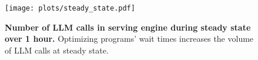 \begin{figure}[t]
\centering
\texttt{[image: plots/steady\_state.pdf]}

\vspace{-2mm}
\caption{\small \textbf{Number of LLM calls in serving engine during steady state over 1 hour.}  Optimizing programs' wait times increases the volume of LLM calls at steady state.}
\vspace{-5mm}
\label{fig:steady_state}
\end{figure}